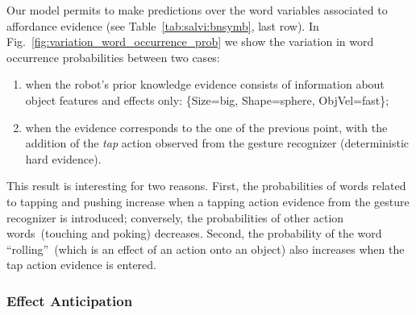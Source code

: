 Our model permits to make predictions over the word variables associated to affordance evidence (see Table~\ref{tab:salvi:bnsymb}, last row).
In Fig.~\ref{fig:variation_word_occurrence_prob} we show the variation in word occurrence probabilities between two cases:
\begin{enumerate}
\item when the robot's prior knowledge evidence consists of information about object features and effects only: \{Size=big, Shape=sphere, ObjVel=fast\};

\item when the evidence corresponds to the one of the previous point, with the addition of the \emph{tap} action observed from the gesture recognizer (deterministic hard evidence).
\end{enumerate}

This result is interesting for two reasons.
First, the probabilities of words related to tapping and pushing increase when a tapping action evidence from the gesture recognizer is introduced; conversely, the probabilities of other action words~(touching and poking) decreases.
Second, the probability of the word ``rolling''~(which is an effect of an action onto an object) also increases when the tap action evidence is entered.

\subsubsection{Effect Anticipation}
\label{sec:gestures:results:anticipation_effects}


